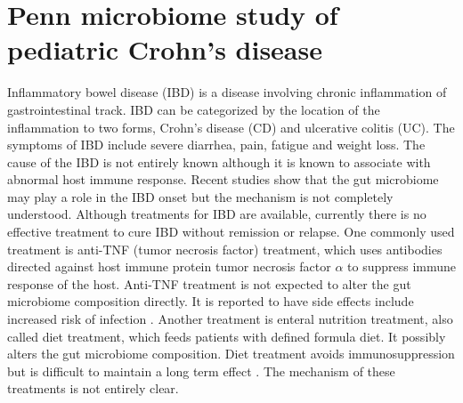 \section{Penn microbiome study of pediatric Crohn's disease}
Inflammatory bowel disease (IBD) is a disease involving chronic inflammation of gastrointestinal track. IBD can be categorized by the location of the inflammation to two forms, Crohn's disease (CD) and ulcerative colitis (UC). The symptoms of IBD include severe diarrhea, pain, fatigue and weight loss. The cause of the IBD is not entirely known although it is known to associate with abnormal host immune response. Recent studies show that the gut microbiome may play a role in the IBD onset \citep{gevers2014treatment} but the mechanism is not completely understood. Although treatments for IBD are available, currently there is no effective treatment to cure IBD without remission or relapse. One commonly used treatment is anti-TNF (tumor necrosis factor) treatment, which uses antibodies directed against host immune protein tumor necrosis factor $\alpha$ to suppress immune response of the host. Anti-TNF treatment is not expected to alter the gut microbiome composition directly. It is reported to have side effects include increased risk of infection \citep{Borrelli:2006tk, Rutgeerts:2012ul}. Another treatment is enteral nutrition treatment, also called diet treatment, which feeds patients with defined formula diet. It possibly alters the gut microbiome composition. Diet treatment avoids immunosuppression but is difficult to maintain a long term effect \citep{Grover:2013dj}. The mechanism of these treatments is not entirely clear.

